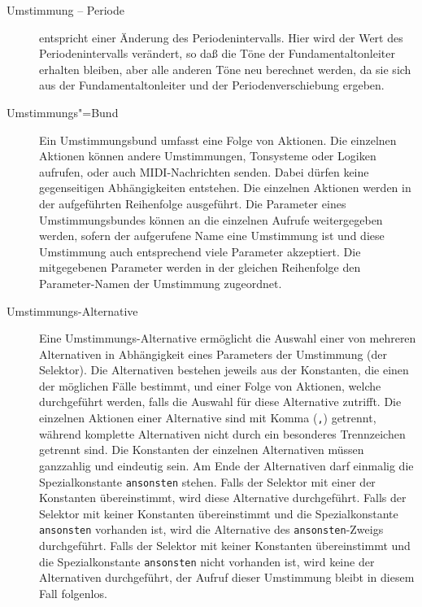 \begin{description}
      

      

  \item[Umstimmung – Periode]
      entspricht einer Änderung des
      Periodenintervalls.
      Hier wird der Wert des
      Periodenintervalls verändert, so daß die Töne der Fundamentaltonleiter
      erhalten bleiben, aber alle anderen Töne neu berechnet werden,
      da sie sich aus der Fundamentaltonleiter und der Periodenverschiebung
      ergeben.

      



  \item[Umstimmungs"=Bund]
      Ein Umstimmungsbund umfasst eine Folge von
      Aktionen. Die einzelnen
      Aktionen können andere Umstimmungen,
      Tonsysteme oder Logiken aufrufen, oder auch MIDI-Nachrichten
      senden. Dabei dürfen keine gegenseitigen
      Abhängigkeiten entstehen. Die einzelnen Aktionen werden in der
      aufgeführten Reihenfolge ausgeführt.
      Die Parameter eines
      Umstimmungsbundes können an die einzelnen Aufrufe weitergegeben
      werden, sofern der aufgerufene Name eine Umstimmung ist und
      diese Umstimmung auch entsprechend viele Parameter akzeptiert.
      Die mitgegebenen Parameter werden in der gleichen Reihenfolge
      den Parameter-Namen der Umstimmung zugeordnet.


      

      

      

      


    \item[Umstimmungs-Alternative] Eine
      Umstimmungs-Alternative ermöglicht die Auswahl einer von
      mehreren Alternativen in Abhängigkeit eines
      Parameters der Umstimmung (der
      Selektor).  Die Alternativen bestehen jeweils
      aus der Konstanten, die einen der möglichen Fälle bestimmt, und
      einer Folge von Aktionen, welche durchgeführt werden, falls die
      Auswahl für diese Alternative zutrifft. Die einzelnen Aktionen
      einer Alternative sind mit Komma (\texttt{,}) getrennt, während
      komplette Alternativen nicht durch ein besonderes Trennzeichen
      getrennt sind. Die Konstanten der einzelnen Alternativen müssen
      ganzzahlig und eindeutig sein. Am Ende der Alternativen darf
      einmalig die Spezialkonstante \texttt{ansonsten}
      stehen. Falls der Selektor mit einer der Konstanten
      übereinstimmt, wird diese Alternative durchgeführt. Falls der
      Selektor mit keiner Konstanten übereinstimmt und die
      Spezialkonstante \texttt{ansonsten} vorhanden ist, wird die
      Alternative des \texttt{ansonsten}-Zweigs durchgeführt. Falls der
      Selektor mit keiner Konstanten übereinstimmt und die
      Spezialkonstante \texttt{ansonsten} nicht vorhanden ist, wird keine
      der Alternativen durchgeführt, der Aufruf dieser Umstimmung
      bleibt in diesem Fall folgenlos.


\end{description}

